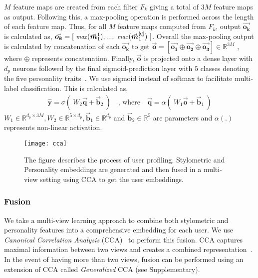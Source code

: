 \documentclass[11pt]{article}
\begin{document}
{$M$ feature maps are created from each filter $F_k$ giving a total of $3M$ feature maps as output. Following this, a max-pooling operation is performed across the length of each feature map. Thus, for all $M$ feature maps computed from $F_k$, output $\vec{\bm{o_k}}$ is calculated as, $ \vec{\bm{o_k}} = [ \text{ \footnotesize \textit{max}}(\vec{\bm{m}}_1^1), ..., \text{ \footnotesize \textit{max}}(\vec{\bm{m}}_1^{ \text{\small M}}) \ ] $. Overall the max-pooling output is calculated by concatenation of each $\vec{\bm{o_k}}$ to get $\vec{\bm{o}} = [\vec{\bm{o_1}} \oplus \vec{\bm{o_2}} \oplus \vec{\bm{o_3}}] \in \mathbb{R}^{3M}$ , where $\oplus$ represents concatenation. Finally, $\vec{\bm{o}}$ is projected onto a dense layer with $d_p$ neurons followed by the final sigmoid-prediction layer with $5$ classes denoting the five personality traits~\cite{matthews2003personality}. We use sigmoid instead of softmax to facilitate multi-label classification. This is calculated as,
\begin{gather}
\bm{\hat{y}} = \sigma( \ W_2\vec{\bm{q}} + \vec{\bm{b}}_2 \ ) \quad \text{, where} \quad \vec{\bm{q}}  = \alpha( \ W_1\vec{\bm{o}} + \vec{\bm{b}}_1 \ ) 
\end{gather}
$W_1\in \mathbb{R}^{d_p \times 3M}, W_2 \in \mathbb{R}^{5 \times d_p}, \vec{\bm{b}}_1 \in \mathbb{R}^{d_p}$ and $\vec{\bm{b}}_2 \in \mathbb{R}^{5}$ are parameters and $\alpha(.)$ represents non-linear activation.

\begin{figure}[t] 
	\centering 
	\texttt{[image: cca]}   
	\caption[]{\footnotesize The figure describes the process of user profiling. Stylometric and Personality embeddings are generated and then fused in a multi-view setting using CCA to get the user embeddings.}
	\label{fig:cca}
    \vspace{-0.4cm}
 \end{figure}
 
 
\subsubsection{Fusion} \label{sec:fusion}
We take a multi-view learning approach to combine both stylometric and personality features into a comprehensive embedding for each user. We use \textit{Canonical Correlation Analysis} (CCA)~\cite{hotelling1936relations} to perform this fusion. CCA captures maximal information between two views and creates a combined representation~\cite{hardoon2004canonical,benton2016learning}. In the event of having more than two views, fusion can be performed using an extension of CCA called \textit{Generalized} CCA (see Supplementary).

}
\end{document}
